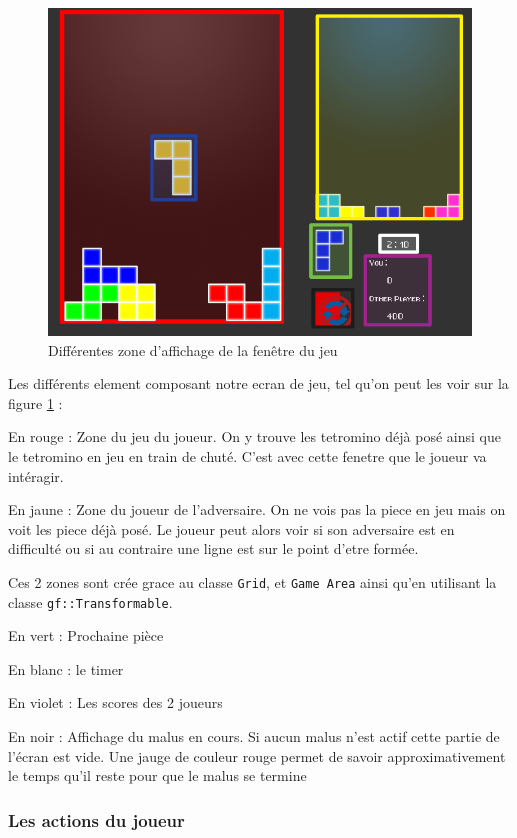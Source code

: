 \documentclass[a4paper, 12pt]{article}
\begin{document}
			\begin{figure}[bt]
				\centering
				\includegraphics[scale=0.35]{img/fenetre.png}
				\caption{Différentes zone d'affichage de la fenêtre du jeu}
				\label{fig:fen}
			\end{figure}

			Les différents element composant notre ecran de jeu, tel qu'on peut les voir sur la figure \ref{fig:fen} : 

			En rouge : Zone du jeu du joueur. On y trouve les tetromino déjà posé ainsi que le tetromino en jeu en train de chuté. C’est avec cette fenetre que le joueur va intéragir.

			En jaune : Zone du joueur de l’adversaire. On ne vois pas la piece en jeu mais on voit les piece déjà posé. Le joueur peut alors voir si son adversaire est en difficulté ou si au contraire une ligne est sur le point d’etre formée.


			Ces 2 zones sont crée grace au classe \texttt{Grid}, et \texttt{Game Area} ainsi qu’en utilisant la classe \texttt{gf::Transformable}.

			En vert : Prochaine pièce

			En blanc : le timer

			En violet : Les scores des 2 joueurs

			En noir : Affichage du malus en cours. Si aucun malus n’est actif cette partie de l’écran est vide. Une jauge de couleur rouge permet de savoir approximativement le temps qu’il reste pour que le malus se termine


		\subsubsection{Les actions du joueur}
\end{document}
